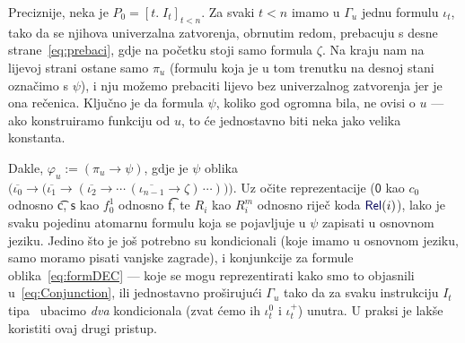 Preciznije, neka je $P_0=[t.\;I_t]_{t<n}$. Za svaki $t<n$ imamo u $\Gamma_u$ jednu formulu $\iota_t$, tako da se njihova univerzalna zatvorenja, obrnutim redom, prebacuju s desne strane~\eqref{eq:prebaci}, gdje na početku stoji samo formula $\zeta$. Na kraju nam na lijevoj strani ostane samo $\pi_u$ (formulu koja je u tom trenutku na desnoj stani označimo s $\psi$), i nju možemo prebaciti lijevo bez univerzalnog zatvorenja jer je ona rečenica. Ključno je da formula $\psi$, koliko god ogromna bila, ne ovisi o $u$ --- ako konstruiramo funkciju od $u$, to će jednostavno biti neka jako velika konstanta.

    Dakle, $\varphi_u:=(\pi_u\to\psi)$, gdje je $\psi$ oblika $\bigl(\overline{\iota_0}\to\bigl(\overline{\iota_1}\to(\overline{\iota_2}\to\dotsm\,(\overline{\iota_{n-1}}\to\zeta)\,\dotsm)\bigr)\bigr)$\text.
Uz očite reprezentacije ($\mathsf0$ kao $c_0$ odnosno \t c, $\mathsf s$ kao $f_0^1$ odnosno \t f, te $R_i$ kao $R_i^m$ odnosno riječ koda $\f{Rel}(i)$), lako je svaku pojedinu atomarnu formulu koja se pojavljuje u $\psi$ zapisati u osnovnom jeziku. Jedino što je još potrebno su kondicionali (koje imamo u osnovnom jeziku, samo moramo pisati vanjske zagrade), i konjunkcije za formule oblika~\eqref{eq:formDEC} --- koje se mogu reprezentirati kako smo to objasnili u~\eqref{eq:Conjunction}, ili jednostavno proširujući $\Gamma_u$ tako da za svaku instrukciju $I_t$ tipa \dec\ ubacimo \emph{dva} kondicionala (zvat ćemo ih $\iota_t^0$ i $\iota_t^+$) unutra. U praksi je lakše koristiti ovaj drugi pristup.

